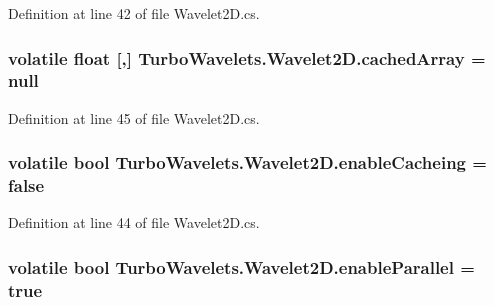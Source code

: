 Definition at line 42 of file Wavelet2\+D.\+cs.

\hypertarget{class_turbo_wavelets_1_1_wavelet2_d_a07949ac8b81d7afa1776e92f11b74834}{
\subsubsection[{cached\+Array}]{\setlength{\rightskip}{0pt plus 5cm}volatile float \mbox{[},\mbox{]} Turbo\+Wavelets.\+Wavelet2\+D.\+cached\+Array = null\hspace{0.3cm}{\ttfamily [protected]}}}\label{class_turbo_wavelets_1_1_wavelet2_d_a07949ac8b81d7afa1776e92f11b74834}


Definition at line 45 of file Wavelet2\+D.\+cs.

\hypertarget{class_turbo_wavelets_1_1_wavelet2_d_a2b5e1636f40bab5b6ee88f6e8bb1b653}{
\subsubsection[{enable\+Cacheing}]{\setlength{\rightskip}{0pt plus 5cm}volatile bool Turbo\+Wavelets.\+Wavelet2\+D.\+enable\+Cacheing = false\hspace{0.3cm}{\ttfamily [protected]}}}\label{class_turbo_wavelets_1_1_wavelet2_d_a2b5e1636f40bab5b6ee88f6e8bb1b653}


Definition at line 44 of file Wavelet2\+D.\+cs.

\hypertarget{class_turbo_wavelets_1_1_wavelet2_d_a742fff705da3ff5a4b6d67e9a56637be}{
\subsubsection[{enable\+Parallel}]{\setlength{\rightskip}{0pt plus 5cm}volatile bool Turbo\+Wavelets.\+Wavelet2\+D.\+enable\+Parallel = true\hspace{0.3cm}{\ttfamily [protected]}}}\label{class_turbo_wavelets_1_1_wavelet2_d_a742fff705da3ff5a4b6d67e9a56637be}


